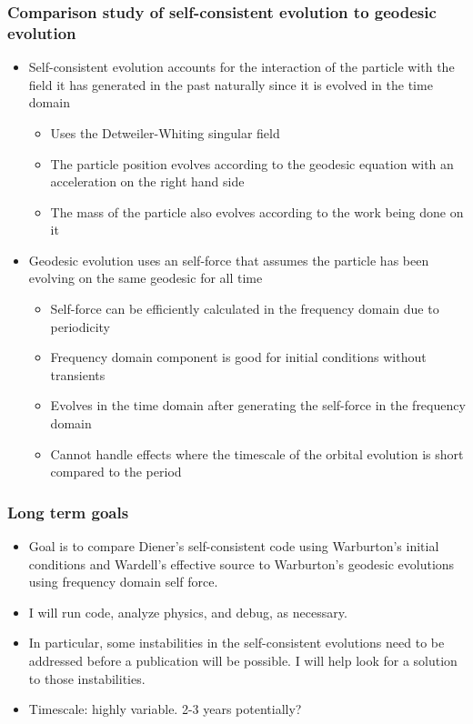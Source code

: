 \documentclass{beamer}
\begin{document}
      
\begin{frame}
  \frametitle{Comparison study of self-consistent evolution to geodesic evolution}
  \begin{itemize}
  \item Self-consistent evolution accounts for the interaction of the particle with the field it has generated in the past naturally since it is evolved in the time domain
    \begin{itemize}
    \item Uses the Detweiler-Whiting singular field 
    \item The particle position evolves according to the geodesic equation with an acceleration on the right hand side
    \item The mass of the particle also evolves according to the work being done on it
    \end{itemize}
  \item Geodesic evolution uses an self-force that assumes the particle has been evolving on the same geodesic for all time
    \begin{itemize}
    \item Self-force can be efficiently calculated in the frequency domain due to periodicity
    \item Frequency domain component is good for initial conditions without transients
    \item Evolves in the time domain after generating the self-force in the frequency domain
    \item Cannot handle effects where the timescale of the orbital evolution is short compared to the period
    \end{itemize}
  \end{itemize}
\end{frame}

\begin{frame}
  \frametitle{Long term goals}
  \begin{itemize}
  \item Goal is to compare Diener's self-consistent code using Warburton's initial conditions and Wardell's effective source to Warburton's geodesic evolutions using frequency domain self force.
  \item I will run code, analyze physics, and debug, as necessary.
  \item In particular, some instabilities in the self-consistent evolutions need to be addressed before a publication will be possible. I will help look for a solution to those instabilities. 
  \item Timescale: highly variable. 2-3 years potentially?
  \end{itemize}
\end{frame}
\end{document}
